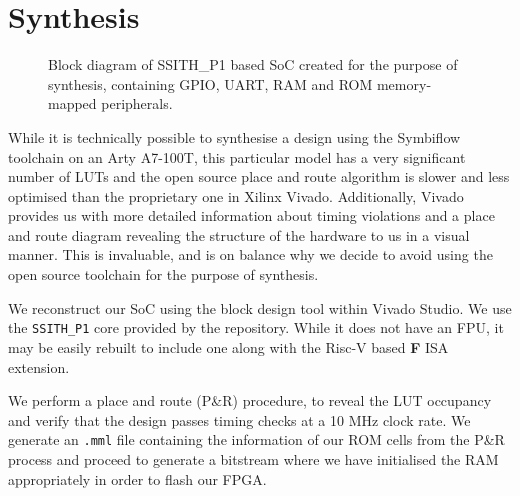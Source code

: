\documentclass[a4paper,8pt]{report}
\begin{document}
\section{Synthesis}
\begin{figure}[b]
  \centering
  \caption{Block diagram of SSITH\_P1 based SoC created for the purpose of
    synthesis, containing GPIO, UART, RAM and ROM memory-mapped peripherals.}
\end{figure}

While it is technically possible to synthesise a design using the Symbiflow
toolchain on an Arty A7-100T, this particular model has a very significant
number of LUTs and the open source place and route algorithm is slower and less
optimised than the proprietary one in Xilinx Vivado. Additionally, Vivado
provides us with more detailed information about timing violations and a place
and route diagram revealing the structure of the hardware to us in a visual
manner. This is invaluable, and is on balance why we decide to avoid using the open
source toolchain for the purpose of synthesis.  

We reconstruct our SoC using the block design tool within Vivado Studio. We use
the \texttt{SSITH\_P1} core provided by the repository. While it does not have
an FPU, it may be easily rebuilt to include one along with the Risc-V based
\textbf{F} ISA extension.

We perform a place and route (P\&R) procedure, to reveal the LUT occupancy and verify
that the design passes timing checks at a 10 MHz clock rate. We generate an \texttt{.mml}
file containing the information of our ROM cells from the P\&R process and
proceed to generate a bitstream where we have initialised the RAM appropriately
in order to flash our FPGA.
\end{document}
